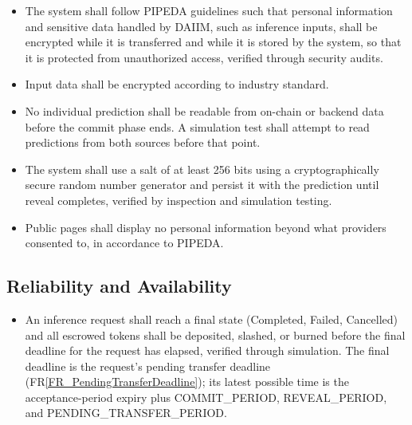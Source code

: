 \documentclass[12pt]{article}
\newcommand{\rref}[1]{FR\ref{#1}}
\newcounter{nfrnum} %
\begin{document}
\noindent \begin{itemize}

\item[NFR\refstepcounter{nfrnum}\thenfrnum \label{NFR_DataEncryption}:] The system shall follow PIPEDA guidelines such that personal information and sensitive data handled by DAIIM, such as inference inputs, shall be encrypted while it is transferred and while it is stored by the system, so that it is protected from unauthorized access, verified through security audits.

\item[NFR\refstepcounter{nfrnum}\thenfrnum \label{NFR_InputDataAccess}:] Input data shall be encrypted according to industry standard.

\item[NFR\refstepcounter{nfrnum}\thenfrnum \label{NFR_PredictionsHidden}:] No individual prediction shall be readable from on-chain or backend data before the commit phase ends. A simulation test shall attempt to read predictions from both sources before that point.

\item[NFR\refstepcounter{nfrnum}\thenfrnum \label{NFR_CommitSalt}:] The system shall use a salt of at least 256 bits using a cryptographically secure random number generator and persist it with the prediction until reveal completes, verified by inspection and simulation testing.

\item[NFR\refstepcounter{nfrnum}\thenfrnum \label{NFR_PublicPagesPrivacy}:] Public pages shall display no personal information beyond what providers consented to, in accordance to PIPEDA.

\end{itemize}

\subsection{Reliability and Availability}

\noindent \begin{itemize}

\item[NFR\refstepcounter{nfrnum}\thenfrnum \label{NFR_FinalState}:] An inference request shall reach a final state (Completed, Failed, Cancelled) and all escrowed tokens shall be deposited, slashed, or burned before the final deadline for the request has elapsed, verified through simulation. The final deadline is the request's pending transfer deadline (\rref{FR_PendingTransferDeadline}); its latest possible time is the acceptance-period expiry plus COMMIT\_PERIOD, REVEAL\_PERIOD, and PENDING\_TRANSFER\_PERIOD.

\end{itemize}
\end{document}
